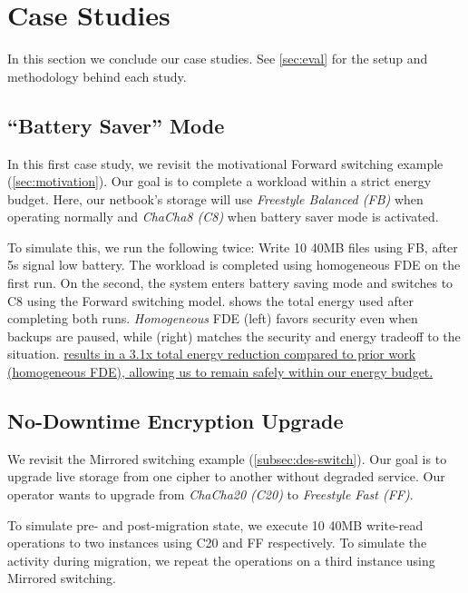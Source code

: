 \section{Case Studies}\label{sec:usecases}

In this section we conclude our case studies. See \cref{sec:eval} for the setup
and methodology behind each study.


\subsection{``Battery Saver'' Mode}\label{subsec:usecase-battery}

In this first case study, we revisit the motivational Forward switching example
(\cref{sec:motivation}). Our goal is to complete a workload within a strict
energy budget. Here, our netbook's storage will use {\em Freestyle Balanced
(FB)} when operating normally and {\em ChaCha8 (C8)} when battery saver mode is
activated.



To simulate this, we run the following twice: Write 10 40MB files using FB,
after 5s signal low battery. The workload is completed using homogeneous FDE on
the first run. On the second, the system enters battery saving mode and \sys
switches to C8 using the Forward switching model. 
shows the total energy used after completing both runs. {\em Homogeneous} FDE
(left) favors security even when backups are paused, while \sys (right) matches
the security and energy tradeoff to the situation. \uline{\sys results in a 3.1x
total energy reduction compared to prior work (homogeneous FDE), allowing us to
remain safely within our energy budget.}


\subsection{No-Downtime Encryption Upgrade}\label{subsec:usecase-upgrade}

We revisit the Mirrored switching example (\cref{subsec:des-switch}). Our goal
is to upgrade live storage from one cipher to another without degraded service.
Our operator wants to upgrade from {\em ChaCha20 (C20)} to {\em Freestyle Fast
(FF)}.

To simulate pre- and post-migration state, we execute 10 40MB write-read
operations to two \sys instances using C20 and FF respectively. To simulate the
activity during migration, we repeat the operations on a third instance using
Mirrored switching.

